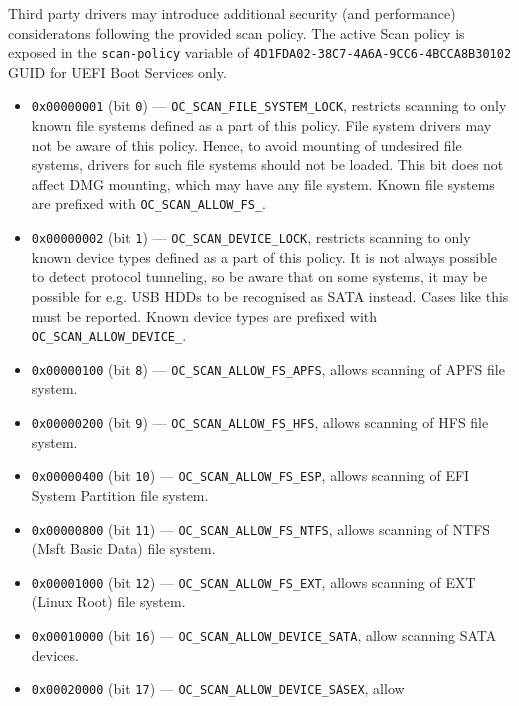 \documentclass[]{article}
\providecommand{\tightlist}{%
  \setlength{\itemsep}{0pt}\setlength{\parskip}{0pt}}
\begin{document}
\begin{enumerate}
  Third party drivers may introduce additional security (and performance)
  consideratons following the provided scan policy. The active Scan policy is exposed
  in the \texttt{scan-policy} variable of \texttt{4D1FDA02-38C7-4A6A-9CC6-4BCCA8B30102}
  GUID for UEFI Boot Services only.

  \begin{itemize}
  \tightlist
    \item \texttt{0x00000001} (bit \texttt{0}) --- \texttt{OC\_SCAN\_FILE\_SYSTEM\_LOCK}, restricts
    scanning to only known file systems defined as a part of this policy. File system
    drivers may not be aware of this policy. Hence, to avoid mounting of undesired file
    systems, drivers for such file systems should not be loaded. This bit does not affect DMG mounting,
    which may have any file system. Known file systems are prefixed with
    \texttt{OC\_SCAN\_ALLOW\_FS\_}.
    \item \texttt{0x00000002} (bit \texttt{1}) --- \texttt{OC\_SCAN\_DEVICE\_LOCK}, restricts scanning
    to only known device types defined as a part of this policy. It is not always possible
    to detect protocol tunneling, so be aware that on some systems, it may be possible for
    e.g. USB HDDs to be recognised as SATA instead. Cases like this must be reported. Known device
    types are prefixed with \texttt{OC\_SCAN\_ALLOW\_DEVICE\_}.
    \item \texttt{0x00000100} (bit \texttt{8}) --- \texttt{OC\_SCAN\_ALLOW\_FS\_APFS}, allows scanning
    of APFS file system.
    \item \texttt{0x00000200} (bit \texttt{9}) --- \texttt{OC\_SCAN\_ALLOW\_FS\_HFS}, allows scanning
    of HFS file system.
    \item \texttt{0x00000400} (bit \texttt{10}) --- \texttt{OC\_SCAN\_ALLOW\_FS\_ESP}, allows scanning
    of EFI System Partition file system.
    \item \texttt{0x00000800} (bit \texttt{11}) --- \texttt{OC\_SCAN\_ALLOW\_FS\_NTFS}, allows scanning
    of NTFS (Msft Basic Data) file system.
    \item \texttt{0x00001000} (bit \texttt{12}) --- \texttt{OC\_SCAN\_ALLOW\_FS\_EXT}, allows scanning
    of EXT (Linux Root) file system.
    \item \texttt{0x00010000} (bit \texttt{16}) --- \texttt{OC\_SCAN\_ALLOW\_DEVICE\_SATA}, allow
    scanning SATA devices.
    \item \texttt{0x00020000} (bit \texttt{17}) --- \texttt{OC\_SCAN\_ALLOW\_DEVICE\_SASEX}, allow

\end{itemize}
\end{enumerate}
\end{document}
